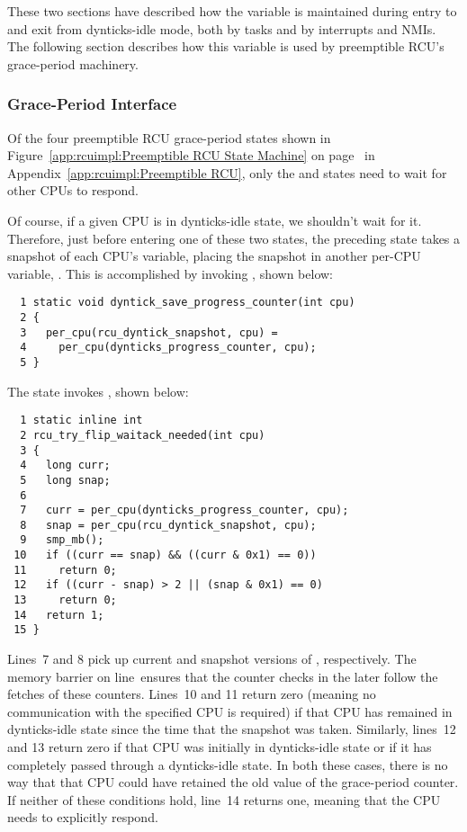 These two sections have described how the
 variable is maintained during
entry to and exit from dynticks-idle mode, both by tasks and by
interrupts and NMIs.
The following section describes how this variable is used by
preemptible RCU's grace-period machinery.

\subsubsection{Grace-Period Interface}
\label{app:formal:Grace-Period Interface}

Of the four preemptible RCU grace-period states shown in
Figure~\ref{app:rcuimpl:Preemptible RCU State Machine} on
page~\pageref{app:rcuimpl:Preemptible RCU State Machine} in
Appendix~\ref{app:rcuimpl:Preemptible RCU},
only the 
and  states need to wait
for other CPUs to respond.

Of course, if a given CPU is in dynticks-idle state, we shouldn't
wait for it.
Therefore, just before entering one of these two states,
the preceding state takes a snapshot of each CPU's
 variable, placing the
snapshot in another per-CPU variable,
.
This is accomplished by invoking
, shown below:

{ \scriptsize
\begin{verbatim}
  1 static void dyntick_save_progress_counter(int cpu)
  2 {
  3   per_cpu(rcu_dyntick_snapshot, cpu) =
  4     per_cpu(dynticks_progress_counter, cpu);
  5 }
\end{verbatim}
}

The  state invokes
, shown below:

{ \scriptsize
\begin{verbatim}
  1 static inline int
  2 rcu_try_flip_waitack_needed(int cpu)
  3 {
  4   long curr;
  5   long snap;
  6
  7   curr = per_cpu(dynticks_progress_counter, cpu);
  8   snap = per_cpu(rcu_dyntick_snapshot, cpu);
  9   smp_mb();
 10   if ((curr == snap) && ((curr & 0x1) == 0))
 11     return 0;
 12   if ((curr - snap) > 2 || (snap & 0x1) == 0)
 13     return 0;
 14   return 1;
 15 }
\end{verbatim}
}

Lines~7 and 8 pick up current and snapshot versions of
, respectively.
The memory barrier on line~ensures that the counter checks
in the later  follow
the fetches of these counters.
Lines~10 and 11 return zero (meaning no communication with the
specified CPU is required) if that CPU has remained in dynticks-idle
state since the time that the snapshot was taken.
Similarly, lines~12 and 13 return zero if that CPU was initially
in dynticks-idle state or if it has completely passed through a
dynticks-idle state.
In both these cases, there is no way that that CPU could have retained
the old value of the grace-period counter.
If neither of these conditions hold, line~14 returns one, meaning
that the CPU needs to explicitly respond.

